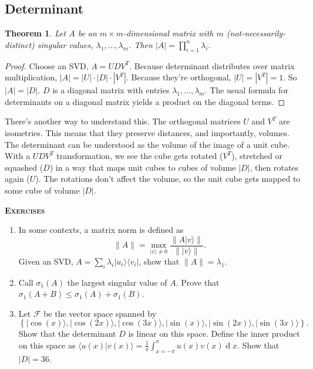\documentclass{amsbook}
\newtheorem{theorem}{Theorem}
\begin{document}
\subsection{Determinant}

 \begin{theorem}
Let $A$ be an $m\times m$-dimensional matrix with $m$ (not-necessarily-distinct) singular values, $\lambda_1, ..., \lambda_m$.  Then $|A|=\prod_{i=1}^n\lambda_i$.
 \end{theorem}

\begin{proof}
Choose an SVD, $A=UDV^T$.  Because determinant distributes over matrix multiplication, $|A|=|U|\cdot|D|\cdot|V^T|$.  Because they're orthogonal, $|U|=|V^T|=1$.  So $|A|=|D|$.  $D$ is a diagonal matrix with entries $\lambda_1, ..., \lambda_m$.  The usual formula for determinants on a diagonal matrix yields a product on the diagonal terms.
\end{proof}

There's another way to understand this.  The orthogonal matrices $U$ and $V^T$ are isometries.  This means that they preserve distances, and importantly, volumes.  The determinant can be understood as the volume of the image of a unit cube.  With a $UDV^T$ transformation, we see the cube gets rotated ($V^T$), stretched or squashed ($D$) in a way that maps unit cubes to cubes of volume $|D|$, then rotates again ($U$).  The rotations don't affect the volume, so the unit cube gets mapped to some cube of volume $|D|$.

{\bfseries\scshape\Large Exercises}

\begin{enumerate}
\item In some contexts, a matrix norm is defined as 
$$
\|A\|=\max_{|v\rangle\neq0}\frac{\|A|v\rangle\|}{\||v\rangle\|}.
$$
Given an SVD, $A=\sum_i\lambda_i|u_i\rangle\langle v_i|$, show that $\|A\|=\lambda_1$.
\item Call $\sigma_1(A)$ the largest singular value of $A$.  Prove that $\sigma_1(A+B)\leq\sigma_1(A)+\sigma_1(B)$.
\item Let $\mathcal F$ be the vector space spanned by 
$$
\left\{|\cos(x)\rangle, |\cos(2x)\rangle, |\cos(3x)\rangle, |\sin(x)\rangle, |\sin(2x)\rangle, |\sin(3x)\rangle\right\}.
$$
Show that the determinant $D$ is linear on this space.  Define the inner product on this space as $\langle u(x)|v(x)\rangle=\frac{1}{\pi}\int_{x=-\pi}^\pi u(x)v(x)\operatorname{d}x$.  Show that $|D|=36$.
\end{enumerate}
\end{document}

